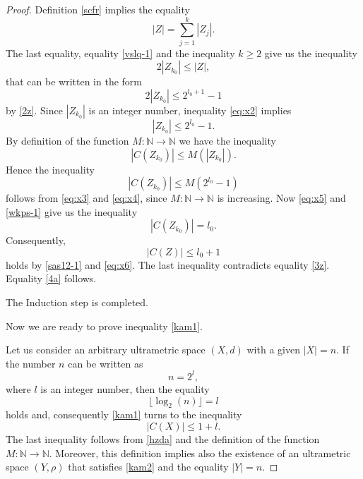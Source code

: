 \documentclass[pdflatex,sn-mathphys-num]{sn-jnl}%
\theoremstyle{thmstyleone}%
\theoremstyle{thmstyletwo}%
\theoremstyle{thmstylethree}%
\theoremstyle{thmstyletwo}%
\theoremstyle{thmstylethree}%
\begin{document}
\begin{proof}
Definition \ref{scfr} implies the equality
\[
|Z|=\sum_{j=1}^{k}|Z_j|.
\]
The last equality, equality \eqref{vslq-1}
and the inequality $k \ge 2$ give us the inequality
\begin{equation*}
2|Z_{k_0}| \le |Z|,
\end{equation*}
that can be written in the form
\begin{equation}\label{eq:x2}
2|Z_{k_0}| \le 2^{l_0+1}-1
\end{equation}
by \eqref{2z}.
Since $|Z_{k_0}|$ is an integer number, inequality \eqref{eq:x2} implies
\begin{equation}\label{eq:x3}
|Z_{k_0}| \le 2^{l_0}-1.
\end{equation}
By definition of the function $M:\mathbb{N}\to\mathbb{N}$ we have the inequality
\begin{equation}\label{eq:x4}
|C(Z_{k_0})| \le M(|Z_{k_0}|).
\end{equation}
Hence the inequality
\begin{equation}\label{eq:x5}
|C(Z_{k_0})| \le M(2^{l_0}-1)
\end{equation}
follows from \eqref{eq:x3} and \eqref{eq:x4}, since $M:\mathbb{N}\to\mathbb{N}$ is increasing. 
Now \eqref{eq:x5} and \eqref{wkps-1} give us the inequality
\begin{equation}\label{eq:x6}
|C(Z_{k_0})| = l_0.
\end{equation}
Consequently,
\begin{equation}\label{eq:x7}
|C(Z)| \le l_0+1
\end{equation}
holds by \eqref{sas12-1} and \eqref{eq:x6}.
The last inequality contradicts equality \eqref{3z}. Equality \eqref{4a} follows.











The Induction step is completed.

Now we are ready to prove inequality \eqref{kam1}.






Let us consider an arbitrary ultrametric space $(X,d)$ with a given $|X| = n$.
If the number $n$ can be written as
\[
n = 2^l,
\]
where $l$ is an integer number, then the equality
\begin{equation}
    \label{5w}
\lfloor \log_2(n) \rfloor = l
\end{equation}
holds and, consequently \eqref{kam1} turns to the inequality
\begin{equation}
    \label{6w}
|C(X)| \leq 1 + l.
\end{equation}
The last inequality follows from \eqref{hzda} and the definition of the function $M : \mathbb{N} \to \mathbb{N}$. Moreover, this definition implies also the existence of an ultrametric space $(Y,\rho)$ that satisfies \eqref{kam2} and the equality $|Y| = n$.


\end{proof}
\end{document}
